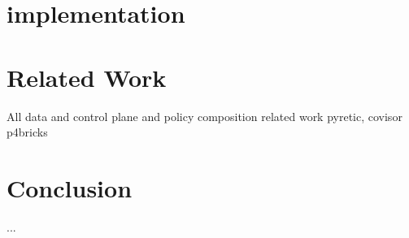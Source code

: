 \documentclass[10pt,sigconf,letterpaper,anonymous]{acmart}
\begin{document}
\section{implementation}

\section{Related Work}

All data and control plane and policy composition related work 
pyretic, covisor
p4bricks
\section{Conclusion}

\begin{acks}
...
\end{acks}




\end{document}
